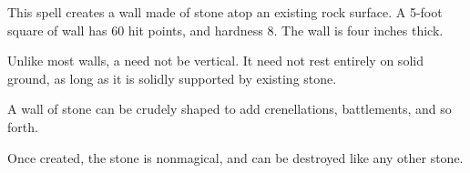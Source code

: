 \begin{spellheader}
    \begin{spelltargetinginfo}
    \end{spelltargetinginfo}
    \begin{spelleffects}
    \end{spelleffects}
\end{spellheader}
\begin{spellcontent}
    \spelleffect This spell creates a wall made of stone atop an existing rock surface. A 5-foot square of wall has 60 hit points, and hardness 8. The wall is four inches thick.
    \par Unlike most walls, a  need not be vertical. It need not rest entirely on solid ground, as long as it is solidly supported by existing stone.
    \par A wall of stone can be crudely shaped to add crenellations, battlements, and so forth.
\end{spellcontent}
\begin{spellfooter}
    \spellnotes Once created, the stone is nonmagical, and can be destroyed like any other stone.
\end{spellfooter}

